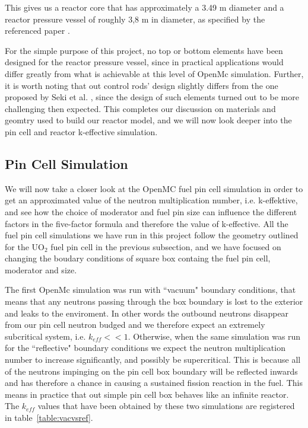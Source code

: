 \documentclass[twocolumn,a4paper,10pt]{article}
\begin{document}
\par
This gives us a reactor core that has approximately a 3.49 m diameter and a reactor pressure vessel of roughly 3,8 m in diameter, as specified by the referenced paper \cite{APWR}.\\ \par
For the simple purpose of this project, no top or bottom elements have been designed for the reactor pressure vessel, since in practical applications would differ greatly from what is achievable at this level of OpenMc simulation. Further, it is worth noting that out control rods' design slightly differs from the one proposed by Seki et al. \cite{APWR}, since the design of such elements turned out to be more challenging then expected. This completes our discussion on materials and geomtry used to build our reactor model, and we will now look deeper into the pin cell and reactor k-effective simulation.

\subsection[Pin Cell Simulation]{\centering Pin Cell Simulation}
\label{subsec:Pin Cell Simulation}

\par
We will now take a closer look at the OpenMC fuel pin cell simulation in order to get an approximated value of the neutron multiplication number, i.e. k-effektive, and see how the choice of moderator and fuel pin size can influence the different factors in the five-factor formula and therefore the value of k-effective. All the fuel pin cell simulations we have run in this project follow the geometry outlined for the UO$_2$ fuel pin cell in the previous subsection, and we have focused on changing the boudary conditions of square box containg the fuel pin cell, moderator and size. \\ 

\par
The first OpenMc simulation was run with ``vacuum" boundary conditions, that means that any neutrons passing through the box boundary is lost to the exterior and leaks to the enviroment. In other words the outbound neutrons disappear from our pin cell neutron budged and we therefore expect an extremely subcritical system, i.e. $k_{eff} << 1$. Otherwise, when the same simulation was run for the ``reflective" boundary conditions we expect the neutron multiplication number to increase significantly, and possibly be supercritical. This is because all of the neutrons impinging on the pin cell box boundary will be reflected inwards and has therefore a chance in causing a sustained fission reaction in the fuel. This means in practice that out simple pin cell box behaves like an infinite reactor. The $k_{eff}$ values that have been obtained by these two simulations are registered in table~\ref{table:vacvsref}. 
\end{document}
